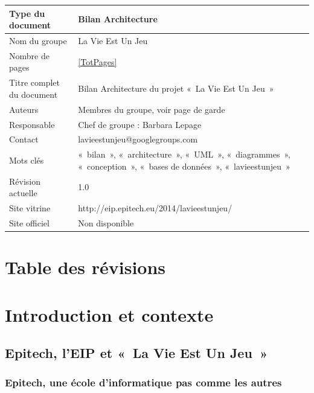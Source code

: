 \documentclass{life-fr}
\begin{document}
\begin{tabular}{ | m{5cm} | m{10cm} | }
  \hline
  Type du document & Bilan Architecture\\
  \hline
  Nom du groupe & La Vie Est Un Jeu\\
  \hline
  Nombre de pages & \ref{TotPages} \\
  \hline
  Titre complet du document & Bilan Architecture du projet «~La Vie Est Un Jeu~»\\
  \hline
  Auteurs & Membres du groupe, voir page de garde\\
  \hline
  Responsable & Chef de groupe : Barbara Lepage\\
  \hline
  Contact & lavieestunjeu@googlegroups.com\\
  \hline
  Mots clés & «~bilan~», «~architecture~», «~UML~», «~diagrammes~», «~conception~», «~bases de données~», «~lavieestunjeu~»\\
  \hline
  Révision actuelle & 1.0\\
  \hline
  Site vitrine & http://eip.epitech.eu/2014/lavieestunjeu/\\
  \hline
  Site officiel & Non disponible\\
  \hline
\end{tabular}

\chapter*{Table des révisions}

\listofrevisions

\newpage

\tableofcontents


\chapter{Introduction et contexte}

\section{Epitech, l'EIP et «~La Vie Est Un Jeu~»}

\subsection{Epitech, une école d'informatique pas comme les autres}
\end{document}
